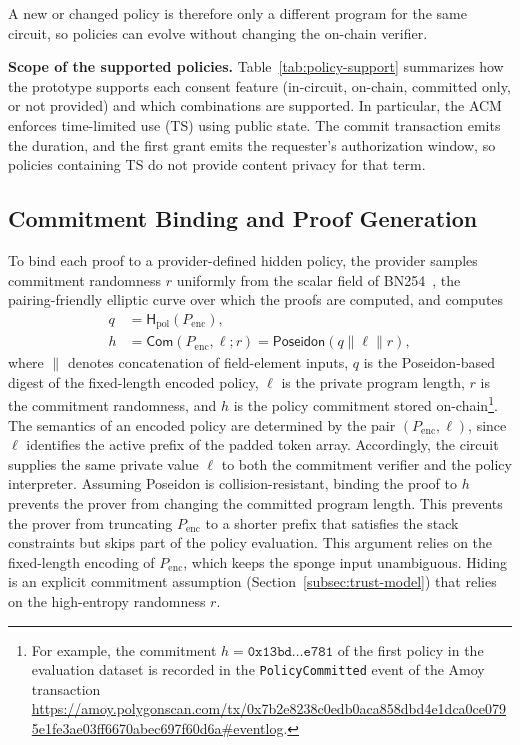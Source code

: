 A new or changed policy is therefore only a different program for the same circuit, so policies can evolve without changing the on-chain verifier.

\noindent\textbf{Scope of the supported policies.}
Table~\ref{tab:policy-support} summarizes how the prototype supports each consent feature (in-circuit, on-chain, committed only, or not provided) and which combinations are supported.
In particular, the ACM enforces time-limited use (TS) using public state.
The commit transaction emits the duration, and the first grant emits the requester's authorization window, so policies containing TS do not provide content privacy for that term.



\subsection{Commitment Binding and Proof Generation}
\label{subsec:commitment}

To bind each proof to a provider-defined hidden policy, the provider samples commitment randomness $r$ uniformly from the scalar field of BN254~\cite{barreto2006pairing,reitwiessner2017eip196}, the pairing-friendly elliptic curve over which the proofs are computed, and computes
\begin{equation}
	\begin{split}
		q & = \mathsf{H}_{\mathrm{pol}}(P_{\mathrm{enc}}), \\
		h & = \mathsf{Com}(P_{\mathrm{enc}},\ell; r)
		= \mathsf{Poseidon}(q\parallel \ell\parallel r),
	\end{split}
\end{equation}
where $\parallel$ denotes concatenation of field-element inputs, $q$ is the Poseidon-based digest of the fixed-length encoded policy, $\ell$ is the private program length, $r$ is the commitment randomness, and $h$ is the policy commitment stored on-chain\footnote{For example, the commitment $h=\texttt{0x13bd}\ldots\texttt{e781}$ of the first policy in the evaluation dataset is recorded in the \texttt{PolicyCommitted} event of the Amoy transaction \url{https://amoy.polygonscan.com/tx/0x7b2e8238c0edb0aca858dbd4e1dca0ce0795e1fe3ae03ff6670abec697f60d6a\#eventlog}.}.
The semantics of an encoded policy are determined by the pair $(P_{\mathrm{enc}},\ell)$, since $\ell$ identifies the active prefix of the padded token array.
Accordingly, the circuit supplies the same private value $\ell$ to both the commitment verifier and the policy interpreter.
Assuming Poseidon is collision-resistant, binding the proof to $h$ prevents the prover from changing the committed program length.
This prevents the prover from truncating $P_{\mathrm{enc}}$ to a shorter prefix that satisfies the stack constraints but skips part of the policy evaluation.
This argument relies on the fixed-length encoding of $P_{\mathrm{enc}}$, which keeps the sponge input unambiguous.
Hiding is an explicit commitment assumption (Section~\ref{subsec:trust-model}) that relies on the high-entropy randomness $r$.

